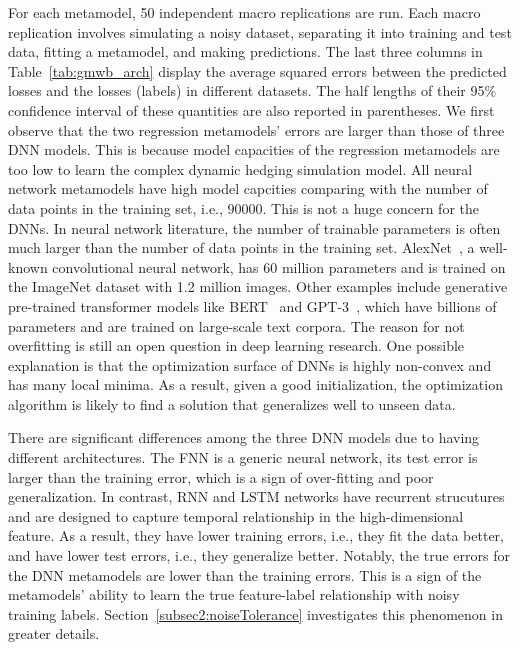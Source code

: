 For each metamodel, 50 independent macro replications are run.
Each macro replication involves simulating a noisy dataset, separating it into training and test data, fitting a metamodel, and making predictions.
The last three columns in Table~\ref{tab:gmwb_arch} display the average squared errors between the predicted losses and the losses (labels) in different datasets.
The half lengths of their 95\% confidence interval of these quantities are also reported in parentheses.
We first observe that the two regression metamodels' errors are larger than those of three DNN models.
This is because model capacities of the regression metamodels are too low to learn the complex dynamic hedging simulation model.
All neural network metamodels have high model capcities comparing with the number of data points in the training set, i.e., $\num{90000}$.
This is not a huge concern for the DNNs.
In neural network literature, the number of trainable parameters is often much larger than the number of data points in the training set.
AlexNet~\citep{krizhevsky2012imagenet}, a well-known convolutional neural network, has 60 million parameters and is trained on the ImageNet dataset with 1.2 million images.
Other examples include generative pre-trained transformer models like BERT~\citep{devlin2018bert} and GPT-3~\citep{brown2020language}, which have billions of parameters and are trained on large-scale text corpora.
The reason for not overfitting is still an open question in deep learning research.
One possible explanation is that the optimization surface of DNNs is highly non-convex and has many local minima.
As a result, given a good initialization, the optimization algorithm is likely to find a solution that generalizes well to unseen data.

There are significant differences among the three DNN models due to having different architectures.
The FNN is a generic neural network, its test error is larger than the training error, which is a sign of over-fitting and poor generalization.
In contrast, RNN and LSTM networks have recurrent strucutures and are designed to capture temporal relationship in the high-dimensional feature.
As a result, they have lower training errors, i.e., they fit the data better, and have lower test errors, i.e., they generalize better.
Notably, the true errors for the DNN metamodels are lower than the training errors.
This is a sign of the metamodels' ability to learn the true feature-label relationship with noisy training labels. 
Section~\ref{subsec2:noiseTolerance} investigates this phenomenon in greater details.

